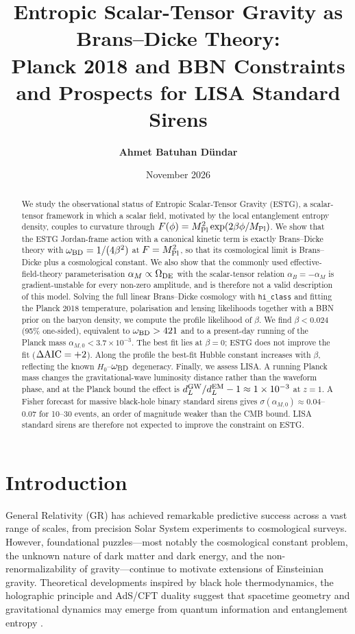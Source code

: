 \documentclass[11pt,a4paper]{article}
\title{\textbf{Entropic Scalar-Tensor Gravity as Brans--Dicke Theory:\\ Planck 2018 and BBN Constraints and Prospects for LISA Standard Sirens}}
\author{\textbf{Ahmet Batuhan Dündar}}
\date{November 2026}
\begin{document}
\maketitle

\begin{abstract}
We study the observational status of Entropic Scalar-Tensor Gravity (ESTG), a scalar-tensor framework in which a scalar field, motivated by the local entanglement entropy density, couples to curvature through $F(\phi) = M_{\rm Pl}^2 \exp(2\beta\phi/M_{\rm Pl})$. We show that the ESTG Jordan-frame action with a canonical kinetic term is exactly Brans--Dicke theory with $\omega_{\rm BD} = 1/(4\beta^2)$ at $F = M_{\rm Pl}^2$, so that its cosmological limit is Brans--Dicke plus a cosmological constant. We also show that the commonly used effective-field-theory parameterisation $\alpha_M \propto \Omega_{\rm DE}$ with the scalar-tensor relation $\alpha_B = -\alpha_M$ is gradient-unstable for every non-zero amplitude, and is therefore not a valid description of this model. Solving the full linear Brans--Dicke cosmology with \texttt{hi\_class} and fitting the Planck 2018 temperature, polarisation and lensing likelihoods together with a BBN prior on the baryon density, we compute the profile likelihood of $\beta$. We find $\beta < 0.024$ (95\% one-sided), equivalent to $\omega_{\rm BD} > 421$ and to a present-day running of the Planck mass $\alpha_{M,0} < 3.7 \times 10^{-3}$. The best fit lies at $\beta = 0$; ESTG does not improve the fit ($\Delta{\rm AIC} = +2$). Along the profile the best-fit Hubble constant increases with $\beta$, reflecting the known $H_0$--$\omega_{\rm BD}$ degeneracy. Finally, we assess LISA. A running Planck mass changes the gravitational-wave luminosity distance rather than the waveform phase, and at the Planck bound the effect is $d_L^{\rm GW}/d_L^{\rm EM} - 1 \approx 1\times10^{-3}$ at $z=1$. A Fisher forecast for massive black-hole binary standard sirens gives $\sigma(\alpha_{M,0}) \approx 0.04$--$0.07$ for 10--30 events, an order of magnitude weaker than the CMB bound. LISA standard sirens are therefore not expected to improve the constraint on ESTG.
\end{abstract}

\section{Introduction}
General Relativity (GR) has achieved remarkable predictive success across a vast range of scales, from precision Solar System experiments to cosmological surveys. However, foundational puzzles---most notably the cosmological constant problem, the unknown nature of dark matter and dark energy, and the non-renormalizability of gravity---continue to motivate extensions of Einsteinian gravity. Theoretical developments inspired by black hole thermodynamics, the holographic principle and AdS/CFT duality suggest that spacetime geometry and gravitational dynamics may emerge from quantum information and entanglement entropy \cite{Jacobson1995,Verlinde2011,VanRaamsdonk2010}.
\end{document}
